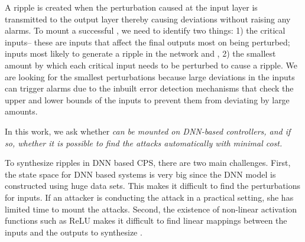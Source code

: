 A ripple is created when the perturbation caused at the input layer is transmitted to the output layer thereby causing deviations without raising any alarms. 
To mount a successful \attack, we need to identify two things: 1) the critical inputs-- these are inputs that affect the final outputs most on being perturbed; inputs most likely to generate a ripple in the network and , 2) the smallest amount by which each critical input needs to be perturbed to cause a ripple. We are looking for the smallest perturbations because large deviations in the inputs can trigger alarms due to the inbuilt error detection mechanisms that 
check the upper and lower bounds of the inputs to prevent them from deviating by large amounts.


In this work, we ask whether { \attack \em can be mounted on DNN-based controllers, and if so, whether it is possible to find the attacks automatically with minimal cost.} 


To synthesize ripples in DNN based CPS, there are two main challenges. First, the state space for DNN based systems is very big since the DNN model is constructed using huge data sets. This makes it difficult to find the perturbations for inputs. If an attacker is conducting the attack in a practical setting, she has limited time to mount the attacks.  %
Second, the existence of non-linear activation functions such as ReLU makes it difficult to find linear mappings between the inputs and the outputs to synthesize \attack.

